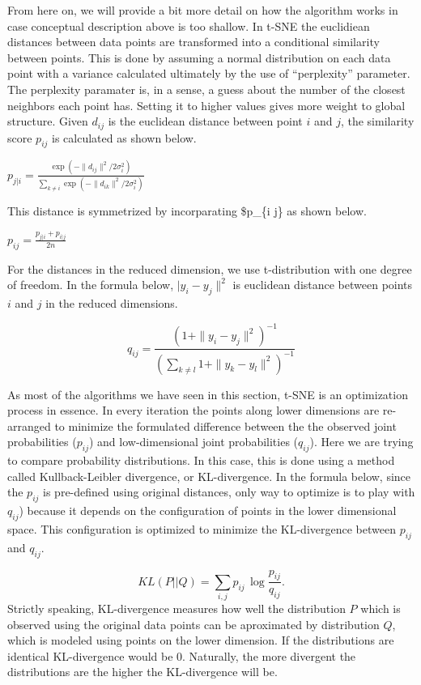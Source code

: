 \documentclass[12pt,]{krantz}
\begin{document}
From here on, we will provide a bit more detail on how the algorithm works in case conceptual description above is too shallow. In t-SNE the euclidiean distances between data points are transformed into a conditional similarity between points. This is done by assuming a normal distribution on each data point with a variance calculated ultimately by the use of ``perplexity'' parameter. The perplexity paramater is, in a sense, a guess about the number of the closest neighbors each point has. Setting it to higher values gives more weight to global structure. Given \(d_{ij}\) is the euclidean distance between point \(i\) and \(j\), the similarity score \(p_{ij}\) is calculated as shown below.

\(p_{j | i} = \frac{\exp(-\|d_{ij}\|^2 / 2 σ_i^2)}{∑_{k \neq i} \exp(-\|d_{ik}\|^2 / 2 σ_i^2)}\)

This distance is symmetrized by incorparating \$p\_\{i \textbar{} j\} as shown below.

\(p_{i j}=\frac{p_{j|i} + p_{i|j}}{2n}\)

For the distances in the reduced dimension, we use t-distribution with one degree of freedom. In the formula below, \(| y_i-y_j\|^2\) is euclidean distance between points \(i\) and \(j\) in the reduced dimensions.

\[
q_{i j} = \frac{(1+ \| y_i-y_j\|^2)^{-1}}{(∑_{k \neq l} 1+ \| y_k-y_l\|^2)^{-1} }
\]

As most of the algorithms we have seen in this section, t-SNE is an optimization process in essence. In every iteration the points along lower dimensions are re-arranged to minimize the formulated difference between the the observed joint probabilities (\(p_{i j}\)) and low-dimensional joint probabilities (\(q_{i j}\)). Here we are trying to compare probability distributions. In this case, this is done using a method called Kullback-Leibler divergence, or KL-divergence. In the formula below, since the \(p_{i j}\) is pre-defined using original distances, only way to optimize is to play with \(q_{i j}\)) because it depends on the configuration of points in the lower dimensional space. This configuration is optimized to minimize the KL-divergence between \(p_{i j}\) and \(q_{i j}\).

\[
KL(P||Q) = \sum_{i, j} p_{ij} \, \log \frac{p_{ij}}{q_{ij}}.
\]
Strictly speaking, KL-divergence measures how well the distribution \(P\) which is observed using the original data points can be aproximated by distribution \(Q\), which is modeled using points on the lower dimension. If the distributions are identical KL-divergence would be 0. Naturally, the more divergent the distributions are the higher the KL-divergence will be.
\end{document}
